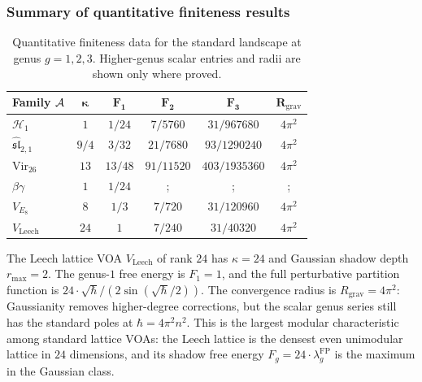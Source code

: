 \subsubsection{Summary of quantitative finiteness results}

\begin{table}[ht]
\centering
\caption{Quantitative finiteness data for the standard landscape at genus $g = 1, 2, 3$. Higher-genus scalar entries and radii are shown only where proved.}
\renewcommand{\arraystretch}{1.4}
{\footnotesize
\begin{tabular}{|l|c|c|c|c|c|}
\hline
\textbf{Family $\mathcal{A}$} & $\boldsymbol{\kappa}$ & $\boldsymbol{F_1}$ & $\boldsymbol{F_2}$ & $\boldsymbol{F_3}$ & $\boldsymbol{R_{\mathrm{grav}}}$ \\
\hline
$\mathcal{H}_1$ & $1$ & $1/24$ & $7/5760$ & $31/967680$ & $4\pi^2$ \\
\hline
$\widehat{\mathfrak{sl}}_{2,1}$ & $9/4$ & $3/32$ & $21/7680$ & $93/1290240$ & $4\pi^2$ \\
\hline
$\mathrm{Vir}_{26}$ & $13$ & $13/48$ & $91/11520$ & $403/1935360$ & $4\pi^2$ \\
\hline
$\beta\gamma$ & $1$ & $1/24$ &; &; &; \\
\hline
$V_{E_8}$ & $8$ & $1/3$ & $7/720$ & $31/120960$ & $4\pi^2$ \\
\hline
$V_{\mathrm{Leech}}$ & $24$ & $1$ & $7/240$ & $31/40320$ & $4\pi^2$ \\
\hline
\end{tabular}}
\end{table}

\begin{remark}
The Leech lattice VOA $V_{\mathrm{Leech}}$ of rank $24$ has $\kappa = 24$
and Gaussian shadow depth $r_{\max} = 2$. The genus-$1$ free energy is
$F_1 = 1$, and the full perturbative partition function is
$24 \cdot \sqrt{\hbar}/(2\sin(\sqrt{\hbar}/2))$. The convergence radius
is $R_{\mathrm{grav}} = 4\pi^2$: Gaussianity removes higher-degree
corrections, but the scalar genus series still has the standard poles at
$\hbar = 4\pi^2 n^2$. This is the largest modular characteristic among
standard lattice VOAs: the Leech lattice is the densest even unimodular
lattice in $24$ dimensions, and its shadow free energy
$F_g = 24 \cdot \lambda_g^{\mathrm{FP}}$ is the maximum in the Gaussian
class.
\end{remark}

